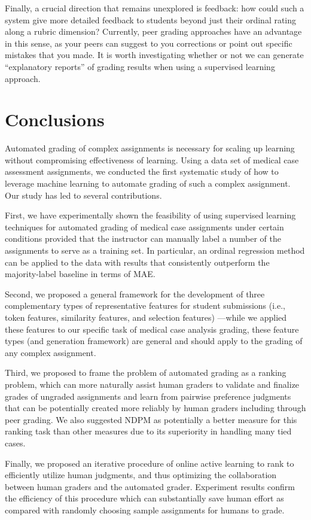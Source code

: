 Finally, a crucial direction that remains unexplored is feedback: how could
such a system give more detailed feedback to students beyond just their
ordinal rating along a rubric dimension? Currently, peer grading approaches
have an advantage in this sense, as your peers can suggest to you
corrections or point out specific mistakes that you made. It is worth
investigating whether or not we can generate ``explanatory reports'' of
grading results when using a supervised learning approach.

\section{Conclusions}

Automated grading of complex assignments is necessary for scaling up
learning without compromising effectiveness of learning. Using a data set
of medical case assessment assignments, we conducted the first systematic
study of how to leverage machine learning to automate grading of such a
complex assignment. Our study has led to several contributions.

First, we have experimentally shown the feasibility of using supervised
learning techniques for automated grading of medical case assignments under
certain conditions provided that the instructor can manually label a number
of the assignments to serve as a training set. In particular, an ordinal
regression method can be applied to the data with results that consistently
outperform the majority-label baseline in terms of MAE.

Second, we proposed a general framework for the development of three
complementary types of representative features for student submissions
(i.e., token features, similarity features, and selection features)
---while we applied these features to our specific task of medical case
analysis grading, these feature types (and generation framework) are
general and should apply to the grading of any complex assignment.

Third, we proposed to frame the problem of automated grading as a ranking
problem, which can more naturally assist human graders to validate and
finalize grades of ungraded assignments and learn from pairwise preference
judgments that can be potentially created more reliably by human graders
including through peer grading. We also suggested NDPM as potentially a
better measure for this ranking task than other measures due to its
superiority in handling many tied cases.

Finally, we proposed an iterative procedure of online active learning to
rank to efficiently utilize human judgments, and thus optimizing the
collaboration between human graders and the automated grader. Experiment
results confirm the efficiency of this procedure which can substantially
save human effort as compared with randomly choosing sample assignments for
humans to grade.
